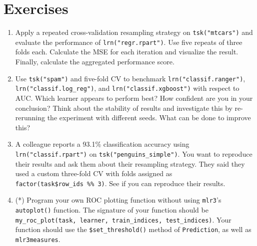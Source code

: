 \hypertarget{exercises-1}{%
\section{Exercises}\label{exercises-1}}

\begin{enumerate}
\def\labelenumi{\arabic{enumi}.}
\item
  Apply a repeated cross-validation resampling strategy on
  \texttt{tsk("mtcars")} and evaluate the performance of
  \texttt{lrn("regr.rpart")}. Use five repeats of three folds each.
  Calculate the MSE for each iteration and visualize the result.
  Finally, calculate the aggregated performance score.
\item
  Use \texttt{tsk("spam")} and five-fold CV to benchmark
  \texttt{lrn("classif.ranger")}, \texttt{lrn("classif.log\_reg")}, and
  \texttt{lrn("classif.xgboost")} with respect to AUC. Which learner
  appears to perform best? How confident are you in your conclusion?
  Think about the stability of results and investigate this by
  re-rerunning the experiment with different seeds. What can be done to
  improve this?
\item
  A colleague reports a 93.1\% classification accuracy using
  \texttt{lrn("classif.rpart")} on \texttt{tsk("penguins\_simple")}. You
  want to reproduce their results and ask them about their resampling
  strategy. They said they used a custom three-fold CV with folds
  assigned as \texttt{factor(task\$row\_ids\ \%\%\ 3)}. See if you can
  reproduce their results.
\item
  (*) Program your own ROC plotting function without using
  \texttt{mlr3}'s \texttt{autoplot()} function. The signature of your
  function should be
  \texttt{my\_roc\_plot(task,\ learner,\ train\_indices,\ test\_indices)}.
  Your function should use the \texttt{\$set\_threshold()} method of
  \texttt{Prediction}, as well as \texttt{mlr3measures}.
\end{enumerate}
